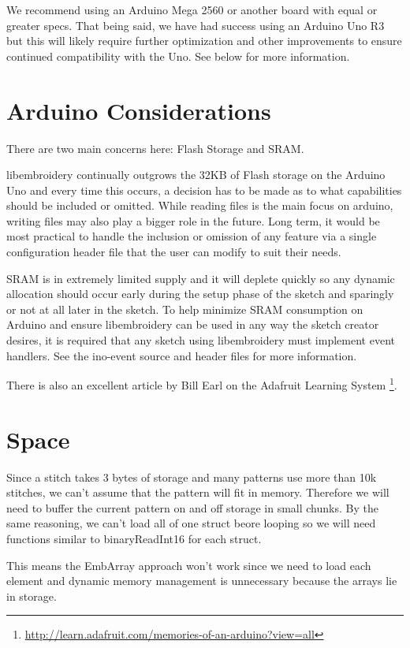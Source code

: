 \documentclass[10pt]{report}
\begin{document}
We recommend using an Arduino Mega 2560 or another board with equal or
greater specs. That being said, we have had success using an Arduino Uno
R3 but this will likely require further optimization and other
improvements to ensure continued compatibility with the Uno. See below
for more information.

\section{Arduino Considerations}

There are two main concerns here: Flash Storage and SRAM.

libembroidery continually outgrows the 32KB of Flash storage on the
Arduino Uno and every time this occurs, a decision has to be made as to
what capabilities should be included or omitted. While reading files is
the main focus on arduino, writing files may also play a bigger role
in the future. Long term, it would be most practical to handle the
inclusion or omission of any feature via a single configuration header
file that the user can modify to suit their needs.

SRAM is in extremely limited supply and it will deplete quickly so any
dynamic allocation should occur early during the setup phase of the
sketch and sparingly or not at all later in the sketch. To help minimize
SRAM consumption on Arduino and ensure libembroidery can be used in any
way the sketch creator desires, it is required that any sketch using
libembroidery must implement event handlers. See the ino-event source
and header files for more information.

There is also an excellent article by Bill Earl on the Adafruit Learning
System
\footnote{\url{http://learn.adafruit.com/memories-of-an-arduino?view=all}}.

\section{Space}

Since a stitch takes 3 bytes of storage and many patterns use more than
10k stitches, we can't assume that the pattern will fit in memory. Therefore
we will need to buffer the current pattern on and off storage in small
chunks. By the same reasoning, we can't load all of one struct beore
looping so we will need functions similar to binaryReadInt16 for each
struct.

This means the EmbArray approach won't work since we need to load
each element and dynamic memory management is unnecessary because
the arrays lie in storage.
\end{document}
